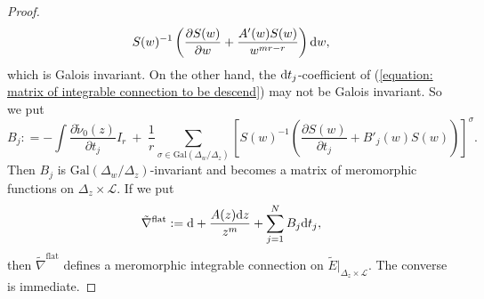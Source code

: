 \documentclass[pdftex]{sigma}
\numberwithin{equation}{section}
\begin{document}
\begin{proof}
\[ S(w)^{-1}\left( \frac{\partial S(w)}{\partial w}+\frac{A'(w)S(w)}{w^{mr-r}}\right){\rm d}w,
\]
which is Galois invariant.
On the other hand, the ${\rm d}t_j$-coefficient of
(\ref{equation: matrix of integrable connection to be descend})
may not be Galois invariant.
So we put
\[
 B_j: =
 -\int\frac {\partial \tilde{\nu}_0(z)} {\partial t_j} I_r
 \ + \ \frac{1}{r}\sum_{\sigma\in\mathrm{Gal}(\Delta_w/\Delta_z)}
 \left[ S(w)^{-1} \left(\frac {\partial S(w)} {\partial t_j}+B'_j(w)S(w) \right) \right]^{\sigma}.
\]
Then $B_j$ is $\mathrm{Gal}(\Delta_w/\Delta_z)$-invariant and
becomes a matrix of meromorphic functions on $\Delta_z\times{\mathcal L}$.
If we put
\[
 \tilde{\nabla}^{\mathrm{flat}}:=
 {\rm d}+\frac{A(z){\rm d}z}{z^m}+\sum_{j=1}^N B_j {\rm d}t_j,
\]
then $\tilde{\nabla}^{\mathrm{flat}}$ defines a meromorphic integrable connection on
$\tilde{E}|_{\Delta_z\times{\mathcal L}}$.
The converse is im\-me\-diate.
\end{proof}
\end{document}
